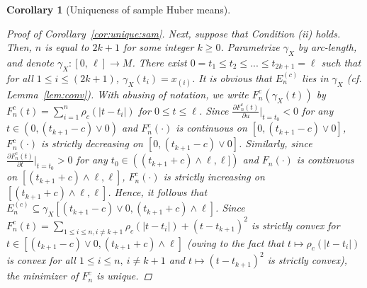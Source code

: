 \documentclass[preprint]{imsart}
\theoremstyle{plain}
\newtheorem{corollary}{Corollary}
\theoremstyle{remark}
\begin{document}
\begin{appendix}
\begin{corollary}[Uniqueness of sample Huber means]
\begin{proof}[Proof of Corollary~\ref{cor:unique:sam}]
Next, suppose that Condition (ii) holds. Then, $n$ is equal to $2k+1$ for some integer $k \ge 0$. Parametrize $\gamma_{X}$ by arc-length, and denote $\gamma_{X} : [0,\, \ell] \rightarrow M$. There exist $0 = t_{1} \le t_{2} \le ... \le t_{2k+1} = \ell$ such that for all $1 \le i \le (2k+1)$, $\gamma_{X}(t_{i}) = x_{(i)}$. It is obvious that $E^{(c)}_{n}$ lies in $\gamma_{X}$ (cf. Lemma~\ref{lem:conv}). With abusing of notation, we write $F^{c}_{n}(\gamma_{X}(t))$ by $F^{c}_{n}(t)= \sum_{i=1}^{n}\rho_{c}(|t-t_{i}|)$ for $0 \le t \le \ell$. Since $\frac{\partial F^{c}_{n}(t)}{\partial u}|_{t=t_0} < 0$ for any $t \in (0, (t_{k+1}-c)\vee 0)$ and $F^{c}_{n}(\cdot)$ is continuous on $[0, (t_{k+1}-c)\vee 0]$, $F^{c}_{n}(\cdot)$ is strictly decreasing on $[0, (t_{k+1}-c)\vee 0]$. Similarly, since $\frac{\partial F^{c}_{n}(t)}{\partial t}|_{t=t_0} > 0$ for any $t_0 \in ((t_{k+1} + c)\wedge \ell, \ell])$ and $F_{n}(\cdot)$ is continuous on $[(t_{k+1} + c)\wedge \ell, \ell]$, $F^{c}_{n}(\cdot)$ is strictly increasing on $[(t_{k+1} + c)\wedge \ell, \ell]$. Hence, it follows that $E^{(c)}_{n} \subseteq \gamma_{X}[(t_{k+1} - c) \vee 0 , (t_{k+1} + c) \wedge \ell]$. Since $F^{c}_{n}(t)= \sum_{1 \le i \le n, i\neq k+1} \rho_{c}(|t-t_i|) + (t- t_{k+1})^2$ is strictly convex for $t \in [(t_{k+1} - c) \vee 0 , (t_{k+1} + c) \wedge \ell]$ (owing to the fact that $t \mapsto \rho_{c}(|t-t_i|)$ is convex for all $1 \le i \le n, ~ i \neq k+1$ and $t \mapsto (t-t_{k+1})^2$ is strictly convex), the minimizer of $F^{c}_{n}$ is unique. 


\end{proof}
\end{corollary}
\end{appendix}
\end{document}
